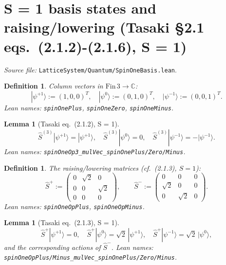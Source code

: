 \documentclass[a4paper,11pt]{article}
\newtheorem{lemma}[theorem]{Lemma}
\newtheorem{definition}[theorem]{Definition}
\begin{document}
\section{S = 1 basis states and raising/lowering
         (Tasaki \S2.1 eqs.~(2.1.2)-(2.1.6), S = 1)}
\label{sec:spinonebasis}

\emph{Source file:} \texttt{LatticeSystem/Quantum/SpinOneBasis.lean}.

\begin{definition}
Column vectors in $\mathrm{Fin}\,3 \to \mathbb C$:
\[
  |\psi^{+1}\rangle := (1, 0, 0)^T, \quad
  |\psi^{0}\rangle  := (0, 1, 0)^T, \quad
  |\psi^{-1}\rangle := (0, 0, 1)^T.
\]
Lean names: \texttt{spinOnePlus}, \texttt{spinOneZero},
\texttt{spinOneMinus}.
\end{definition}

\begin{lemma}[Tasaki eq.~(2.1.2), S = 1]
\[
  \hat S^{(3)} |\psi^{+1}\rangle = |\psi^{+1}\rangle, \quad
  \hat S^{(3)} |\psi^{0}\rangle = 0, \quad
  \hat S^{(3)} |\psi^{-1}\rangle = -|\psi^{-1}\rangle.
\]
Lean names:
\texttt{spinOneOp3\_mulVec\_spinOnePlus/Zero/Minus}.
\end{lemma}

\begin{definition}
The raising/lowering matrices (cf.~(2.1.3), $S = 1$):
\[
  \hat S^{+} := \begin{pmatrix} 0 & \sqrt 2 & 0 \\ 0 & 0 & \sqrt 2 \\ 0 & 0 & 0 \end{pmatrix}, \qquad
  \hat S^{-} := \begin{pmatrix} 0 & 0 & 0 \\ \sqrt 2 & 0 & 0 \\ 0 & \sqrt 2 & 0 \end{pmatrix}.
\]
Lean names: \texttt{spinOneOpPlus}, \texttt{spinOneOpMinus}.
\end{definition}

\begin{lemma}[Tasaki eq.~(2.1.3), S = 1]
\[
  \hat S^{+} |\psi^{+1}\rangle = 0, \quad
  \hat S^{+} |\psi^{0}\rangle = \sqrt 2 \,|\psi^{+1}\rangle, \quad
  \hat S^{+} |\psi^{-1}\rangle = \sqrt 2 \,|\psi^{0}\rangle,
\]
and the corresponding actions of $\hat S^{-}$. Lean names:
\texttt{spinOneOpPlus/Minus\_mulVec\_spinOnePlus/Zero/Minus}.
\end{lemma}
\end{document}
